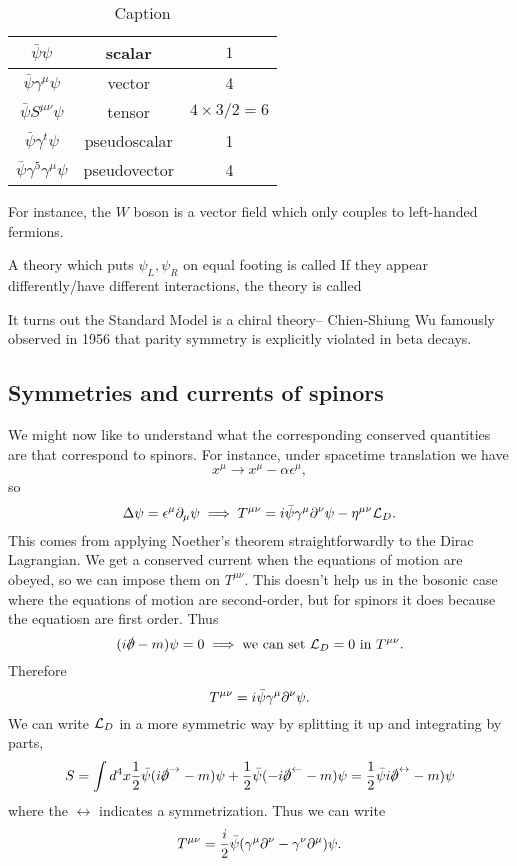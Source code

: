 \begin{table}[]
    \centering
    \begin{tabular}{|c|c|c|}
        \hline
         $\bar\psi \psi$ & scalar & $1$\\ \hline
         $\bar \psi \gamma^\mu \psi$ & vector & 4\\ \hline
         $\bar \psi S^{\mu\nu}\psi$ & tensor & $4\times 3/2=6$\\ \hline
         $\bar \psi \gamma^t \psi$ & pseudoscalar & 1\\ \hline
         $\bar \psi \gamma^5 \gamma^\mu \psi$ & pseudovector & 4\\ \hline
    \end{tabular}
    \caption{Caption}
    \label{tab:bilinears}
\end{table}

For instance, the $W$ boson is a vector field which only couples to left-handed fermions. 
\begin{defn}
A theory which puts $\psi_L,\psi_R$ on equal footing is called  If they appear differently/have different interactions, the theory is called 

It turns out the Standard Model is a chiral theory-- Chien-Shiung Wu famously observed in 1956 that parity symmetry is explicitly violated in beta decays.
\end{defn}

\subsection*{Symmetries and currents of spinors} We might now like to understand what the corresponding conserved quantities are that correspond to spinors. For instance, under spacetime translation we have
$$x^\mu \to x^\mu -\alpha \epsilon^\mu,$$
so
$$\Delta \psi=\epsilon^\mu \partial_\mu \psi \implies T^{\mu\nu}=i \bar \psi \gamma^\mu \partial^\nu \psi-\eta^{\mu\nu}\mathcal L_D.$$
This comes from applying Noether's theorem straightforwardly to the Dirac Lagrangian.
We get a conserved current when the equations of motion are obeyed, so we can impose them on $T^{\mu\nu}$. This doesn't help us in the bosonic case where the equations of motion are second-order, but for spinors it does because the equatiosn are first order. Thus
$$(i\slashed{\p}-m)\psi=0 \implies \text{we can set }\cL_D=0\text{ in }T^{\mu\nu}.$$
Therefore
$$T^{\mu\nu}=i\bar \psi \gamma^\mu \partial^\nu \psi.$$
We can write $\mathcal L_D$ in a more symmetric way by splitting it up and integrating by parts,
$$S=\int d^4x \frac{1}{2} \bar \psi(i \slashed{\p}^\rightarrow -m)\psi+\frac{1}{2}\bar \psi(-i \slashed{\p}^\leftarrow - m)\psi = \frac{1}{2} \bar \psi i \slashed{\p}^\leftrightarrow - m)\psi$$
where the $\leftrightarrow$ indicates a symmetrization. Thus we can write
$$T^{\mu\nu}=\frac{i}{2}\bar\psi (\gamma^\mu \partial^\nu- \gamma^\nu \partial^\mu)\psi.$$